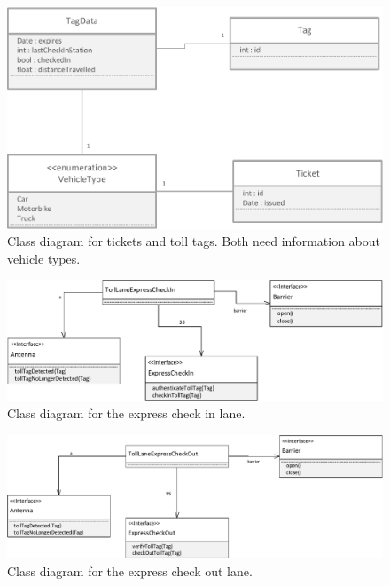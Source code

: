 \begin{figure}[H]
\centerline{\includegraphics[width=\textwidth]{img/class_diagrams/class_diagram_Tag_Ticket_VehicleType}}
\caption{Class diagram for tickets and toll tags. Both need information about vehicle types.}
\label{fig:cld_ttvt}
\end{figure}

\begin{figure}[H]
\centerline{\includegraphics[width=\textwidth]{img/class_diagrams/class_diagram_toll_lane_express_check_in}}
\caption{Class diagram for the express check in lane.}
\label{fig:cld_tlei}
\end{figure}

\begin{figure}[H]
\centerline{\includegraphics[width=\textwidth]{img/class_diagrams/class_diagram_toll_lane_express_check_out}}
\caption{Class diagram for the express check out lane.}
\label{fig:cld_tleo}
\end{figure}

